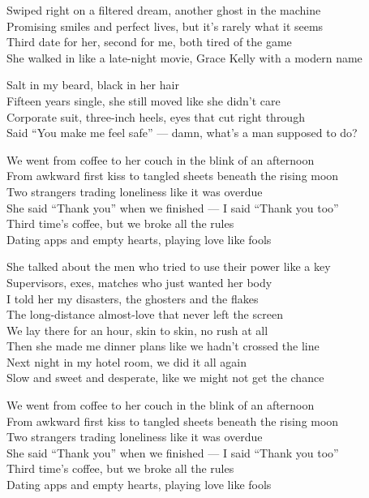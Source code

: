 \begin{lyrics}

Swiped right on a filtered dream, another ghost in the machine\\
Promising smiles and perfect lives, but it’s rarely what it seems\\
Third date for her, second for me, both tired of the game\\
She walked in like a late-night movie, Grace Kelly with a modern name

Salt in my beard, black in her hair\\
Fifteen years single, she still moved like she didn’t care\\
Corporate suit, three-inch heels, eyes that cut right through\\
Said “You make me feel safe” — damn, what’s a man supposed to do?

We went from coffee to her couch in the blink of an afternoon\\
From awkward first kiss to tangled sheets beneath the rising moon\\
Two strangers trading loneliness like it was overdue\\
She said “Thank you” when we finished — I said “Thank you too”\\
Third time’s coffee, but we broke all the rules\\
Dating apps and empty hearts, playing love like fools

She talked about the men who tried to use their power like a key\\
Supervisors, exes, matches who just wanted her body\\
I told her my disasters, the ghosters and the flakes\\
The long-distance almost-love that never left the screen\\
We lay there for an hour, skin to skin, no rush at all\\
Then she made me dinner plans like we hadn’t crossed the line\\
Next night in my hotel room, we did it all again\\
Slow and sweet and desperate, like we might not get the chance

We went from coffee to her couch in the blink of an afternoon\\
From awkward first kiss to tangled sheets beneath the rising moon\\
Two strangers trading loneliness like it was overdue\\
She said “Thank you” when we finished — I said “Thank you too”\\
Third time’s coffee, but we broke all the rules\\
Dating apps and empty hearts, playing love like fools


\end{lyrics}
